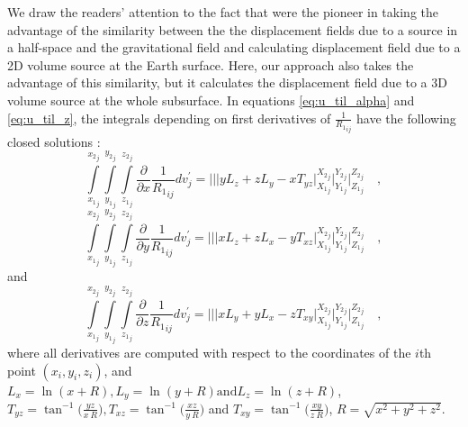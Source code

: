 \documentclass[P]{BrJG_submit}
\begin{document}
We draw the readers' attention to the fact that \cite{Vasco1987} were the pioneer in taking the advantage of the similarity between the the displacement fields due to a source in a half-space and the gravitational field and calculating displacement field due to a 2D volume source at the Earth surface.
Here, our approach also takes the advantage of this similarity, but it calculates the displacement field due to a 3D volume source at the whole subsurface. 
In equations  \ref{eq:u_til_alpha} and \ref{eq:u_til_z}, the integrals depending on 
first derivatives of ${\frac{1}{{R_1}_{ij}}}$ have the following closed solutions 
\citep{Nagyetal2000, Nagyetal2002}:
\begin{equation}
\int\limits_{{x_{1}}_{j}}^{{x_{2}}_{j}} \int\limits_{{y_{1}}_{j}}^{{y_{2}}_{j}} \int\limits_{{z_{1}}_{j}}^{{z_{2}}_{j}}
\frac{\partial }{\partial x} {\frac{1}{{R_1}_{ij}}} dv_{j}^{\prime} \! = \!
\Bigg|\Bigg|\Bigg| 
y L_z  + z L_y -  x  T_{yz} 
\Bigg|_{{X_1}_{j}}^{{X_2}_{j}} \Bigg|_{{Y_1}_{j}}^{{Y_2}_{j}} \Bigg|_{{Z_1}_{j}}^{{Z_2}_{j}} \quad ,
\label{dx1}
\end{equation}
\vspace{-0.5cm}
\begin{equation}
\int\limits_{{x_{1}}_{j}}^{{x_{2}}_{j}} \int\limits_{{y_{1}}_{j}}^{{y_{2}}_{j}} \int\limits_{{z_{1}}_{j}}^{{z_{2}}_{j}}
\frac{\partial }{\partial y} {\frac{1}{{R_1}_{ij}}} dv_{j}^{\prime} \! = \!
\Bigg|\Bigg|\Bigg|
x L_z + z L_x -  y  T_{xz} 
\Bigg|_{{X_1}_{j}}^{{X_2}_{j}} \Bigg|_{{Y_1}_{j}}^{{Y_2}_{j}} \Bigg|_{{Z_1}_{j}}^{{Z_2}_{j}} \quad ,
\label{dy1}
\end{equation}
and
\begin{equation}
\int\limits_{{x_{1}}_{j}}^{{x_{2}}_{j}} \int\limits_{{y_{1}}_{j}}^{{y_{2}}_{j}} \int\limits_{{z_{1}}_{j}}^{{z_{2}}_{j}}
\frac{\partial }{\partial z} {\frac{1}{{R_1}_{ij}}} dv_{j}^{\prime} \! = \!
\Bigg|\Bigg|\Bigg|
x L_y  + y L_x  -  z  T_{xy} 
\Bigg|_{{X_1}_{j}}^{{X_2}_{j}} \Bigg|_{{Y_1}_{j}}^{{Y_2}_{j}} \Bigg|_{{Z_1}_{j}}^{{Z_2}_{j}} \quad ,
\label{dz1}
\end{equation}
where all derivatives are computed with respect to the coordinates of the $i$th point 
$(x_i, y_i, z_i)$, and $L_x = \ln(x + R), L_y = \ln(y + R) \textrm{and} L_z = \ln(z + R)$,
$T_{yz} = \tan^{-1} \big( \frac{yz}{x \: R} \big), T_{xz}  = \tan^{-1} \big( \frac{xz}{y \: R} \big)$  
and $T_{xy} = \tan^{-1} \big( \frac{xy}{z \: R} \big)$,  
$R = \sqrt{x^{2} + y^{2} + z^{2}}$. 
\end{document}
